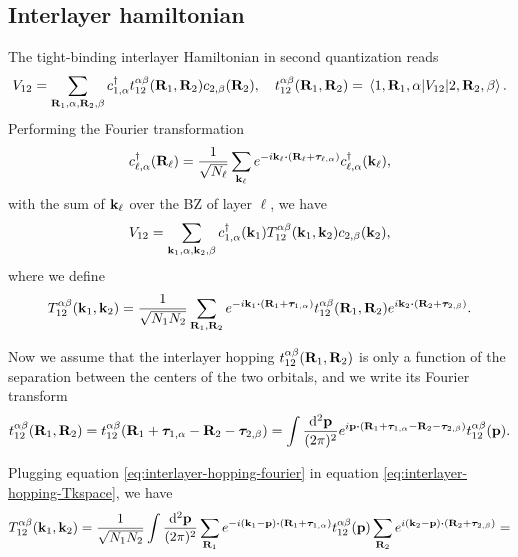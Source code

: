 \documentclass[a4paper,12pt]{report}
\begin{document}
\subsection{Interlayer hamiltonian}

The tight-binding interlayer Hamiltonian in second quantization reads
\begin{equation} \label{eq:interlayer-hopping}
V_{12} = \sum_{{\vb{R}}_1,\alpha,{\vb{R}}_2,\beta} c_{1,\alpha}^{\dagger} t_{12}^{\alpha\beta}({\vb{R}}_1,{\vb{R}}_2) c_{2,\beta}({\vb{R}}_2), \quad
t_{12}^{\alpha\beta}({\vb{R}}_1,{\vb{R}}_2) =
\mel{1,{\vb{R}}_1,\alpha}{V_{12}}{2,{\vb{R}}_2,\beta}.
\end{equation}
Performing the Fourier transformation
\begin{equation} \label{eq:blg-fourier}
c_{\ell,\alpha}^\d(\R_\ell) = \frac{1}{\sqrt{N_\ell}} \sum_{\k_\ell}
e^{-i\k_\ell \vdot (\R_\ell + \vtau_{\ell,\alpha})} c_{\ell,\alpha}^\d(\k_\ell),
\end{equation}
with the sum of ${\vb{k}}_\ell$ over the BZ of layer $\ell$, we have
\begin{equation} \label{eq:interlayer-hopping-kspace}
V_{12} = \sum_{{\vb{k}}_1,\alpha,{\vb{k}}_2,\beta} c_{1,\alpha}^{\dagger}({\vb{k}}_1) T_{12}^{\alpha\beta}({\vb{k}}_1,{\vb{k}}_2) c_{2,\beta}({\vb{k}}_2),
\end{equation}
where we define
\begin{equation} \label{eq:interlayer-hopping-Tkspace}
T_{12}^{\alpha\beta}(\k_1,\k_2) =
\frac{1}{\sqrt{N_1 N_2}} \sum_{\R_1,\R_2} e^{-i\k_1\vdot(\R_1+\vtau_{1,\alpha})}
t_{12}^{\alpha\beta}(\R_1,\R_2) e^{i\k_2\vdot(\R_2+\vtau_{2,\beta})}.
\end{equation}

Now we assume that the interlayer hopping $t_{12}^{\alpha\beta}({\vb{R}}_1,{\vb{R}}_2)$ is only a function of the separation between the centers of the two orbitals, and we write its Fourier transform
\begin{equation} \label{eq:interlayer-hopping-fourier}
t_{12}^{\alpha\beta}(\R_1,\R_2) = t_{12}^{\alpha\beta}(\R_1+\vtau_{1,\alpha}-\R_2-\vtau_{2,\beta}) =
\int \frac{\dd[2]{\p}}{(2\pi)^2} e^{i \p \vdot (\R_1+\vtau_{1,\alpha}-\R_2-\vtau_{2,\beta})} t_{12}^{\alpha\beta}(\p).
\end{equation}

Plugging equation \ref{eq:interlayer-hopping-fourier} in equation \ref{eq:interlayer-hopping-Tkspace}, we have
$$
T_{12}^{\alpha\beta}(\k_1,\k_2) = \frac{1}{\sqrt{N_1 N_2}} \int \frac{\dd[2]{\p}}{(2\pi)^2}
\sum_{\R_1} e^{-i(\k_1-\p)\vdot(\R_1+\vtau_{1,\alpha})} t_{12}^{\alpha\beta}(\p)
\sum_{\R_2} e^{i(\k_2-\p)\vdot(\R_2+\vtau_{2,\beta})} =
$$
\end{document}
